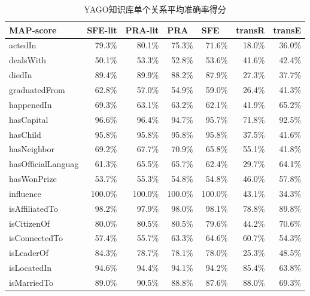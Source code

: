 \begin{table}[H]
  \centering
  \caption{YAGO知识库单个关系平均准确率得分}
    \begin{tabular}{|l|r|r|r|r|r|r|}
    \hline
    MAP-score & \multicolumn{1}{l|}{SFE-lit} & \multicolumn{1}{l|}{PRA-lit} & \multicolumn{1}{l|}{PRA} & \multicolumn{1}{l|}{SFE} & \multicolumn{1}{l|}{transR} & \multicolumn{1}{l|}{transE} \bigstrut\\
    \hline
    actedIn & 79.3\% & 80.1\% & 75.3\% & 71.6\% & 18.0\% & 36.0\% \bigstrut\\
    \hline
    dealsWith & 50.1\% & 53.3\% & 52.8\% & 53.6\% & 41.6\% & 42.4\% \bigstrut\\
    \hline
    diedIn & 89.4\% & 89.9\% & 88.2\% & 87.9\% & 27.3\% & 37.7\% \bigstrut\\
    \hline
    graduatedFrom & 62.8\% & 57.0\% & 54.9\% & 59.0\% & 26.4\% & 41.3\% \bigstrut\\
    \hline
    happenedIn & 69.3\% & 63.1\% & 63.2\% & 62.1\% & 41.9\% & 65.2\% \bigstrut\\
    \hline
    hasCapital & 96.6\% & 96.4\% & 94.7\% & 95.7\% & 71.8\% & 92.5\% \bigstrut\\
    \hline
    hasChild & 95.8\% & 95.8\% & 95.8\% & 95.8\% & 37.5\% & 41.6\% \bigstrut\\
    \hline
    hasNeighbor & 69.2\% & 67.7\% & 70.9\% & 65.8\% & 55.1\% & 41.8\% \bigstrut\\
    \hline
    hasOfficialLanguag & 61.3\% & 65.5\% & 65.7\% & 62.4\% & 29.7\% & 64.1\% \bigstrut\\
    \hline
    hasWonPrize & 53.7\% & 55.3\% & 54.8\% & 54.8\% & 46.0\% & 57.8\% \bigstrut\\
    \hline
    influence & 100.0\% & 100.0\% & 100.0\% & 100.0\% & 43.1\% & 34.3\% \bigstrut\\
    \hline
    isAffiliatedTo & 98.2\% & 97.9\% & 98.0\% & 98.1\% & 78.8\% & 89.8\% \bigstrut\\
    \hline
    isCitizenOf & 80.0\% & 80.5\% & 80.5\% & 79.6\% & 44.2\% & 70.6\% \bigstrut\\
    \hline
    isConnectedTo & 57.4\% & 55.7\% & 63.3\% & 64.6\% & 60.7\% & 54.3\% \bigstrut\\
    \hline
    isLeaderOf & 84.3\% & 78.7\% & 78.1\% & 78.0\% & 25.3\% & 48.5\% \bigstrut\\
    \hline
    isLocatedIn & 94.6\% & 94.4\% & 94.1\% & 94.2\% & 85.4\% & 63.8\% \bigstrut\\
    \hline
    isMarriedTo & 89.0\% & 90.5\% & 88.8\% & 87.6\% & 88.0\% & 69.3\% \bigstrut\\

\end{tabular}
\end{table}
